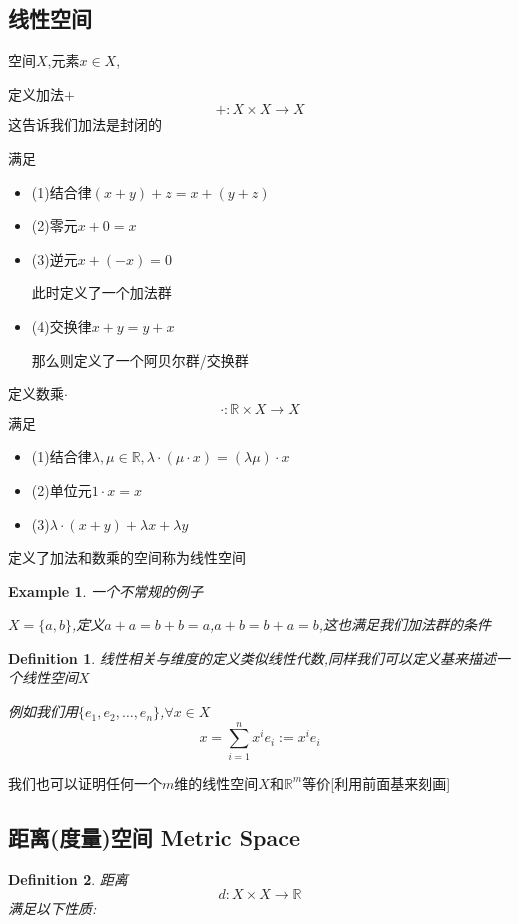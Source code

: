 \documentclass[11pt,hyperref,a4paper,UTF8]{ctexart}
\newtheorem{example}{Example}[subsection]
\newtheorem{definition}{Definition}[subsection]
\newcommand{\RR}{\mathbb{R}}
\begin{document}
\begin{CJK}{UTF8}{gkai}
\subsection{线性空间}
空间$X$,元素$x \in X$,

定义加法$+$
\[+ : X \times X \to X\]
这告诉我们加法是封闭的

满足
\begin{itemize}
  \item (1)结合律$(x + y) + z = x + (y + z)$
  \item (2)零元$x + 0 = x$
  \item (3)逆元$x + (-x) = 0$

  此时定义了一个加法群
  \item (4)交换律$x + y = y + x$

  那么则定义了一个阿贝尔群/交换群
\end{itemize}

定义数乘$\cdot$
\[\cdot : \RR \times X \to X\]
满足

\begin{itemize}
  \item (1)结合律$\lambda,\mu\in \RR, \lambda\cdot(\mu\cdot x) =(\lambda\mu) \cdot x  $
  \item (2)单位元$1\cdot x = x$
  \item (3)$\lambda\cdot(x + y) + \lambda x + \lambda y$
\end{itemize}

定义了加法和数乘的空间称为线性空间

\begin{example}
  一个不常规的例子

  $X = \{a,b\}$,定义$a + a = b + b = a$,$a + b = b + a = b$,这也满足我们加法群的条件
\end{example}

\begin{definition}
  线性相关与维度的定义类似线性代数,同样我们可以定义基来描述一个线性空间$X$

  例如我们用$\{e_1,e_2,\ldots,e_n\}$,$\forall x\in X$
  \[x = \sum_{i = 1}^{n} x^i e_i := x^i e_i\]
\end{definition}

我们也可以证明任何一个$m$维的线性空间$X$和$\RR^m$等价[利用前面基来刻画]

\subsection{距离(度量)空间 Metric Space}

\begin{definition}
  距离
  \[d: X\times X \to \RR\]
  满足以下性质:


\end{definition}
\end{CJK}
\end{document}
